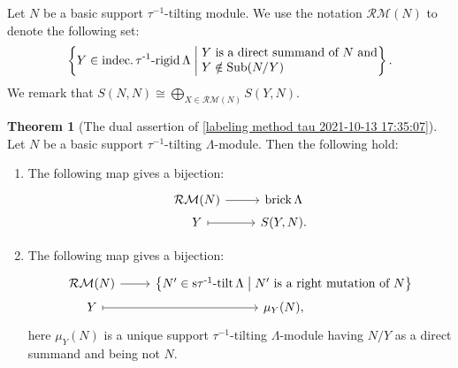 \documentclass[pdftex,a4paper]{article}
\numberwithin{equation}{subsection}
\theoremstyle{definition}
\newtheorem{theorem}{Theorem}[section]
\newcommand{\setmid}{\; \middle|\;}
\newcommand{\itauirigid}{\operatorname{\mathrm{indec.\tau^{-1}-rigid}}}
\newcommand{\stauitilt}{\operatorname{\mathrm{s\tau^{-1}-tilt}}}
\newcommand{\Sub}{\operatorname{\mathrm{Sub}}}
\newcommand{\brick}{\operatorname{\mathrm{brick}}}
\begin{document}
Let \(N\) be a basic support \(\tau^{-1}\)-tilting module.
We use the notation \(\mathcal{RM}(N)\) to denote the following set:
\begin{equation}
	\left\{Y\in \itauirigid \Lambda\setmid \parbox{5cm}{\(Y\) is a direct summand of \(N\) and \(Y\notin \Sub(N/Y)\)}\right\}.
\end{equation}
We remark that \(S(N,N)\cong \bigoplus_{X\in \mathcal{RM}(N)} S(Y,N)\).

\begin{theorem}
	[{The dual assertion of \cref{labeling method tau 2021-10-13 17:35:07}}]\label{right mutation 2021-11-22 20:43:58}
	Let \(N\) be a basic support \(\tau^{-1}\)-tilting \(\Lambda\)-module. Then the following hold:
	\begin{enumerate}
		\item The following map gives a bijection:
		      \begin{equation}\label{2021-09-24 13:11:04}
			      \begin{tikzcd}[row sep=1pt]
				      \mathcal{RM}(N)\ar[r]& \brick \Lambda\\
				      Y \ar[r,mapsto]& S(Y,N).
			      \end{tikzcd}
		      \end{equation}
		\item The following map gives a bijection:
		      \begin{equation}\label{2021-09-24 15:40:15}
			      \begin{tikzcd}[row sep=1pt]
				      \mathcal{RM}(N)\ar[r]& \left\{ N'\in \stauitilt \Lambda \setmid \text{\(N'\) is a right mutation of \(N\)} \right\}\\
				      Y \ar[r,mapsto]& \mu_Y(N),
			      \end{tikzcd}
		      \end{equation}
		      here \(\mu_Y(N)\) is a unique support \(\tau^{-1}\)-tilting \(\Lambda\)-module having \(N/Y\) as a direct summand and being not \(N\). \label{asai d brick}
	\end{enumerate}
\end{theorem}
\end{document}
